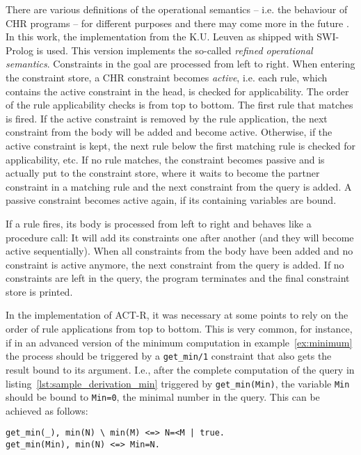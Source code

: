 There are various definitions of the operational semantics -- i.e. the behaviour of CHR programs -- for different purposes and there may come more in the future \cite[11]{fru_chr_book_2009}. In this work, the implementation from the K.U. Leuven as shipped with SWI-Prolog is used\cite{swi_prolog}. This version implements the so-called \emph{refined operational semantics}. Constraints in the goal are processed from left to right. When entering the constraint store, a CHR constraint becomes \emph{active}, i.e. each rule, which contains the active constraint in the head, is checked for applicability. The order of the rule applicability checks is from top to bottom. The first rule that matches is fired. If the active constraint is removed by the rule application, the next constraint from the body will be added and become active. Otherwise, if the active constraint is kept, the next rule below the first matching rule is checked for applicability, etc. If no rule matches, the constraint becomes passive and is actually put to the constraint store, where it waits to become the partner constraint in a matching rule and the next constraint from the query is added. A passive constraint becomes active again, if its containing variables are bound. 

If a rule fires, its body is processed from left to right and behaves like a procedure call: It will add its constraints one after another (and they will become active sequentially). When all constraints from the body have been added and no constraint is active anymore, the next constraint from the query is added. If no constraints are left in the query, the program terminates and the final constraint store is printed.

In the implementation of ACT-R, it was necessary at some points to rely on the order of rule applications from top to bottom. This is very common, for instance, if in an advanced version of the minimum computation in example~\ref{ex:minimum} the process should be triggered by a \lstinline|get_min/1| constraint that also gets the result bound to its argument. I.e., after the complete computation of the query in listing~\ref{lst:sample_derivation_min} triggered by \lstinline|get_min(Min)|, the variable \lstinline|Min| should be bound to \lstinline|Min=0|, the minimal number in the query. This can be achieved as follows:

\begin{lstlisting}[caption={Minimum program with trigger}]
get_min(_), min(N) \ min(M) <=> N=<M | true.
get_min(Min), min(N) <=> Min=N.
\end{lstlisting}

